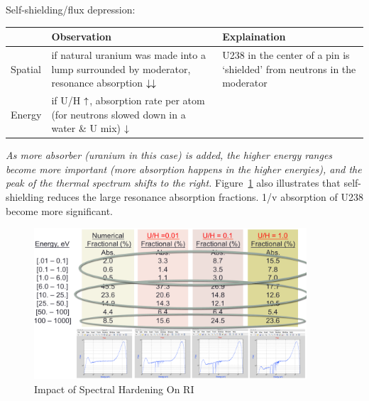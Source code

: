 \documentclass{school-22.211-notes}
\begin{document}
Self-shielding/flux depression: 
\begin{table}
  \centering
  \begin{tabular}{|l|p{6cm}|p{6cm}|} \hline
    & Observation & Explaination \\ \hline
    Spatial 
    & if natural uranium was made into a lump surrounded by moderator, resonance absorption $\downarrow \downarrow$  
    & U238 in the center of a pin is `shielded' from neutrons in the moderator \\ \hline
    Energy
    & if U/H $\uparrow$, absorption rate per atom (for neutrons slowed down in a water \& U mix) $\downarrow$   
    &  \\ \hline
  \end{tabular}
  \end{table}



\clearpage
{}
\textit{As more absorber (uranium in this case) is added, the higher energy ranges become more important (more absorption happens in the higher energies), and the peak of the thermal spectrum shifts to the right.} Figure~\ref{spectral-hardening} also illustrates that self-shielding reduces the large resonance absorption fractions. 1/v absorption of U238 become more significant. 
\begin{figure}
  \centering
  \includegraphics[width=4in]{images/spectral-hardening.png}
  \caption{Impact of Spectral Hardening On RI} \label{spectral-hardening}
\end{figure}
\end{document}
